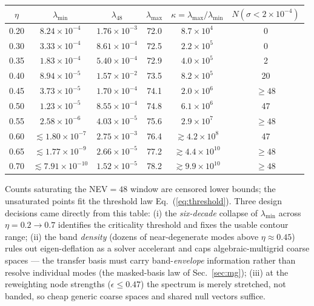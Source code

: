 \documentclass[11pt]{article}
\begin{document}
\begin{center}
\begin{tabular}{cccccc}
\toprule
$\eta$ & $\lambda_{\min}$ & $\lambda_{48}$ & $\lambda_{\max}$ &
$\kappa=\lambda_{\max}/\lambda_{\min}$ & $N(\sigma<2\times10^{-4})$ \\
\midrule
0.20 & $8.24\times10^{-4}$ & $1.76\times10^{-3}$ & 72.0 & $8.7\times10^{4}$ & 0 \\
0.30 & $3.33\times10^{-4}$ & $8.61\times10^{-4}$ & 72.5 & $2.2\times10^{5}$ & 0 \\
0.35 & $1.83\times10^{-4}$ & $5.40\times10^{-4}$ & 72.9 & $4.0\times10^{5}$ & 2 \\
0.40 & $8.94\times10^{-5}$ & $1.57\times10^{-2}$ & 73.5 & $8.2\times10^{5}$ & 20 \\
0.45 & $3.73\times10^{-5}$ & $1.70\times10^{-4}$ & 74.1 & $2.0\times10^{6}$ & $\ge 48$ \\
0.50 & $1.23\times10^{-5}$ & $8.55\times10^{-4}$ & 74.8 & $6.1\times10^{6}$ & 47 \\
0.55 & $2.58\times10^{-6}$ & $4.03\times10^{-5}$ & 75.6 & $2.9\times10^{7}$ & $\ge 48$ \\
0.60 & $\lesssim 1.80\times10^{-7}$ & $2.75\times10^{-3}$ & 76.4 & $\gtrsim 4.2\times10^{8}$ & 47 \\
0.65 & $\lesssim 1.77\times10^{-9}$ & $2.66\times10^{-5}$ & 77.2 & $\gtrsim 4.4\times10^{10}$ & $\ge 48$ \\
0.70 & $\lesssim 7.91\times10^{-10}$ & $1.52\times10^{-5}$ & 78.2 & $\gtrsim 9.9\times10^{10}$ & $\ge 48$ \\
\bottomrule
\end{tabular}
\end{center}

Counts saturating the NEV$=48$ window are censored lower bounds; the
unsaturated points fit the threshold law Eq.~(\ref{eq:threshold}).
Three design decisions came directly from this table:
(i) the \emph{six-decade} collapse of $\lambda_{\min}$ across
$\eta=0.2\to0.7$ identifies the criticality threshold and fixes the
usable contour range;
(ii) the band \emph{density} (dozens of near-degenerate modes above
$\eta \approx 0.45$) rules out eigen-deflation as a solver accelerant
and caps algebraic-multigrid coarse spaces --- the transfer basis must
carry band-\emph{envelope} information rather than resolve individual
modes (the masked-basis law of Sec.~\ref{sec:mg});
(iii) at the reweighting node strengths ($\epsilon \le 0.47$) the
spectrum is merely stretched, not banded, so cheap generic coarse
spaces and shared null vectors suffice.
\end{document}
